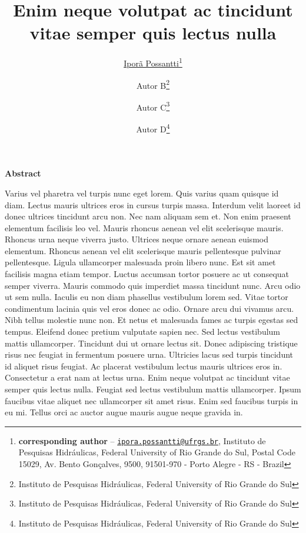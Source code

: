 \documentclass[11pt]{article}
\title{\Large{\textsf{\textbf{Enim neque volutpat ac tincidunt vitae semper quis lectus nulla}}}}
\author{
\href{https://orcid.org/0000-0002-2194-4516}{Iporã Possantti}\thanks{\textbf{corresponding author} -- \href{mailto:ipora.possantti@ufrgs.br}{\texttt{ipora.possantti@ufrgs.br}}, Instituto de Pesquisas Hidráulicas, Federal University of Rio Grande do Sul, Postal Code 15029, Av. Bento Gonçalves, 9500, 91501-970 - Porto Alegre - RS - Brazil} \and
Autor B\thanks{Instituto de Pesquisas Hidráulicas, Federal University of Rio Grande do Sul} \and 
\and Autor C\thanks{Instituto de Pesquisas Hidráulicas, Federal University of Rio Grande do Sul}
\and Autor D\thanks{Instituto de Pesquisas Hidráulicas, Federal University of Rio Grande do Sul}
}
\begin{document}
\maketitle  %
	
\begin{adjustwidth}{20pt}{20pt}
\begin{spacing}{0.8}
	\small
	\begin{center}
		\vspace{10mm}
		\textsf{\textbf{Abstract}}
		\vspace{5mm}
	\end{center}
	
	\noindent Varius vel pharetra vel turpis nunc eget lorem. Quis varius quam quisque id diam. Lectus mauris ultrices eros in cursus turpis massa. Interdum velit laoreet id donec ultrices tincidunt arcu non. Nec nam aliquam sem et. Non enim praesent elementum facilisis leo vel. Mauris rhoncus aenean vel elit scelerisque mauris. Rhoncus urna neque viverra justo. Ultrices neque ornare aenean euismod elementum. Rhoncus aenean vel elit scelerisque mauris pellentesque pulvinar pellentesque. Ligula ullamcorper malesuada proin libero nunc. Est sit amet facilisis magna etiam tempor. Luctus accumsan tortor posuere ac ut consequat semper viverra. Mauris commodo quis imperdiet massa tincidunt nunc. Arcu odio ut sem nulla. Iaculis eu non diam phasellus vestibulum lorem sed. Vitae tortor condimentum lacinia quis vel eros donec ac odio. Ornare arcu dui vivamus arcu. Nibh tellus molestie nunc non. Et netus et malesuada fames ac turpis egestas sed tempus. Eleifend donec pretium vulputate sapien nec. Sed lectus vestibulum mattis ullamcorper. Tincidunt dui ut ornare lectus sit. Donec adipiscing tristique risus nec feugiat in fermentum posuere urna. Ultricies lacus sed turpis tincidunt id aliquet risus feugiat. Ac placerat vestibulum lectus mauris ultrices eros in. Consectetur a erat nam at lectus urna. Enim neque volutpat ac tincidunt vitae semper quis lectus nulla. Feugiat sed lectus vestibulum mattis ullamcorper. Ipsum faucibus vitae aliquet nec ullamcorper sit amet risus. Enim sed faucibus turpis in eu mi. Tellus orci ac auctor augue mauris augue neque gravida in. \\[2ex]
	

\end{spacing}
\end{adjustwidth}
\end{document}
